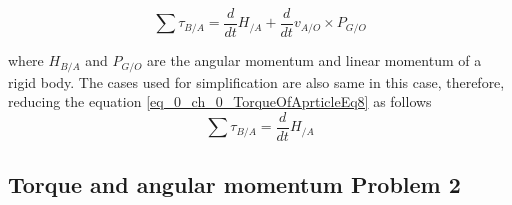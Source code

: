 \begin{equation}\label{eq_0_ch_0_TorqueOfAprticleEq8}
\sum \tau_{B/A} = \frac{d}{dt} H_{/A} + \frac{d}{dt} v_{A/O} \times P_{G/O}
\end{equation}

where $H_{B/A}$ and $P_{G/O}$ are the angular momentum and linear momentum of a rigid body. The cases used for simplification are also same in this case, therefore, reducing the equation \eqref{eq_0_ch_0_TorqueOfAprticleEq8} as follows
\begin{equation}
	\sum \tau_{B/A} = \frac{d}{dt} H_{/A}
\end{equation}

\subsection{Torque and angular momentum Problem 2} \label{Sec_TorqueAndAngularMomentumProblem2}

